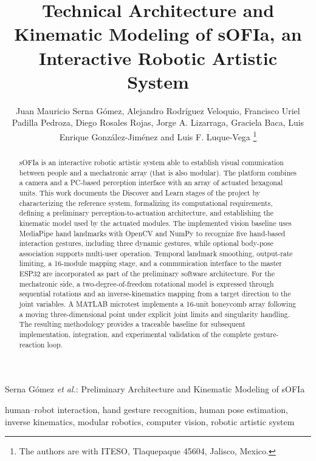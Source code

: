 \documentclass[lettersize,journal]{IEEEtran}
\begin{document}
\title{Technical Architecture and Kinematic Modeling of sOFIa, an Interactive Robotic Artistic System}

\author{Juan Mauricio Serna G\'omez, Alejandro Rodr\'iguez Veloquio, Francisco Uriel Padilla Pedroza, Diego Rosales Rojas, Jorge A. Lizarraga, Graciela Baca, Luis Enrique Gonz\'alez-Jim\'enez and Luis F. Luque-Vega%
\thanks{The authors are with ITESO, Tlaquepaque 45604, Jalisco, Mexico.}}

%
{Serna G\'omez \MakeLowercase{\textit{et al.}}: Preliminary Architecture and Kinematic Modeling of sOFIa}

\maketitle

\begin{abstract}
sOFIa is an interactive robotic artistic system able to establish visual comunication between people and a mechatronic array (that is also modular). The platform combines a camera and a PC-based perception interface with an array of actuated hexagonal units. This work documents the Discover and Learn stages of the project by characterizing the reference system, formalizing its computational requirements, defining a preliminary perception-to-actuation architecture, and establishing the kinematic model used by the actuated modules. The implemented vision baseline uses MediaPipe hand landmarks with OpenCV and NumPy to recognize five hand-based interaction gestures, including three dynamic gestures, while optional body-pose association supports multi-user operation. Temporal landmark smoothing, output-rate limiting, a 16-module mapping stage, and a communication interface to the master ESP32 are incorporated as part of the preliminary software architecture. For the mechatronic side, a two-degree-of-freedom rotational model is expressed through sequential rotations and an inverse-kinematics mapping from a target direction to the joint variables. A MATLAB microtest implements a 16-unit honeycomb array following a moving three-dimensional point under explicit joint limits and singularity handling. The resulting methodology provides a traceable baseline for subsequent implementation, integration, and experimental validation of the complete gesture-reaction loop.
\end{abstract}

\begin{IEEEkeywords}
human--robot interaction, hand gesture recognition, human pose estimation, inverse kinematics, modular robotics, computer vision, robotic artistic system
\end{IEEEkeywords}
\end{document}

